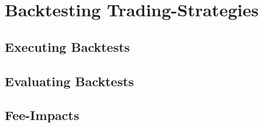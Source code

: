 \section{Backtesting Trading-Strategies}

\subsection{Executing Backtests}

\subsection{Evaluating Backtests}

\subsection{Fee-Impacts}
